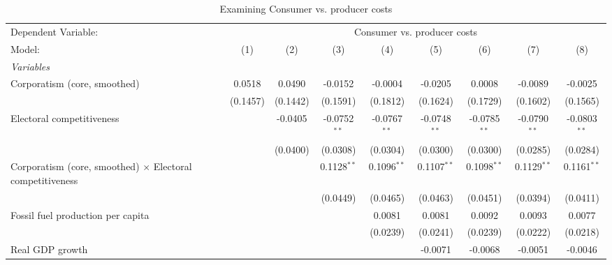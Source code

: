 
\begin{table}[htbp]
   \caption{Examining Consumer vs. producer costs}
   \centering
   \begin{tabular}{lcccccccc}
      \tabularnewline \midrule \midrule
      Dependent Variable: & \multicolumn{8}{c}{Consumer vs. producer costs}\\
      Model:                                                           & (1)      & (2)      & (3)            & (4)            & (5)            & (6)            & (7)            & (8)\\  
      \midrule
      \emph{Variables}\\
      Corporatism (core, smoothed)                                     & 0.0518   & 0.0490   & -0.0152        & -0.0004        & -0.0205        & 0.0008         & -0.0089        & -0.0025\\   
                                                                       & (0.1457) & (0.1442) & (0.1591)       & (0.1812)       & (0.1624)       & (0.1729)       & (0.1602)       & (0.1565)\\   
      Electoral competitiveness                                        &          & -0.0405  & -0.0752$^{**}$ & -0.0767$^{**}$ & -0.0748$^{**}$ & -0.0785$^{**}$ & -0.0790$^{**}$ & -0.0803$^{**}$\\   
                                                                       &          & (0.0400) & (0.0308)       & (0.0304)       & (0.0300)       & (0.0300)       & (0.0285)       & (0.0284)\\   
      Corporatism (core, smoothed) $\times$ Electoral competitiveness  &          &          & 0.1128$^{**}$  & 0.1096$^{**}$  & 0.1107$^{**}$  & 0.1098$^{**}$  & 0.1129$^{**}$  & 0.1161$^{**}$\\   
                                                                       &          &          & (0.0449)       & (0.0465)       & (0.0463)       & (0.0451)       & (0.0394)       & (0.0411)\\   
      Fossil fuel production per capita                                &          &          &                & 0.0081         & 0.0081         & 0.0092         & 0.0093         & 0.0077\\   
                                                                       &          &          &                & (0.0239)       & (0.0241)       & (0.0239)       & (0.0222)       & (0.0218)\\   
      Real GDP growth                                                  &          &          &                &                & -0.0071        & -0.0068        & -0.0051        & -0.0046\\   

\end{tabular}
\end{table}
